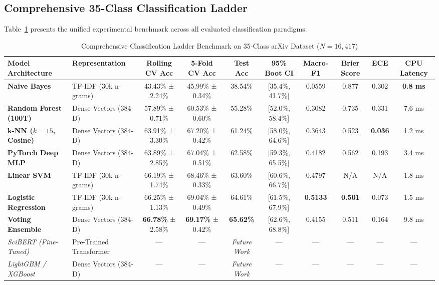 \documentclass[journal]{IEEEtran}
\begin{document}
\subsection{Comprehensive 35-Class Classification Ladder}
Table~\ref{tab:classification_ladder} presents the unified experimental benchmark across all evaluated classification paradigms.

\begin{table}[t]
\caption{Comprehensive Classification Ladder Benchmark on 35-Class arXiv Dataset ($N = 16,417$)}
\label{tab:classification_ladder}
\centering
\small
\begin{tabular}{llcccccccc}
\toprule
\textbf{Model Architecture} & \textbf{Representation} & \textbf{Rolling CV Acc} & \textbf{5-Fold CV Acc} & \textbf{Test Acc} & \textbf{95\% Boot CI} & \textbf{Macro-F1} & \textbf{Brier Score} & \textbf{ECE} & \textbf{CPU Latency} \\
\midrule
\textbf{Naive Bayes} & TF-IDF (30k n-grams) & 43.43\% ± 2.24\% & 45.99\% ± 0.34\% & 38.54\% & [35.4\%, 41.7\%] & 0.0559 & 0.877 & 0.302 & \textbf{0.8 ms} \\
\textbf{Random Forest (100T)} & Dense Vectors (384-D) & 57.89\% ± 0.71\% & 60.53\% ± 0.60\% & 55.28\% & [52.0\%, 58.4\%] & 0.3082 & 0.735 & 0.331 & 7.6 ms \\
\textbf{k-NN ($k=15$, Cosine)} & Dense Vectors (384-D) & 63.91\% ± 3.30\% & 67.20\% ± 0.42\% & 61.24\% & [58.0\%, 64.6\%] & 0.3643 & 0.523 & \textbf{0.036} & 1.2 ms \\
\textbf{PyTorch Deep MLP} & Dense Vectors (384-D) & 63.89\% ± 2.85\% & 67.04\% ± 0.51\% & 62.58\% & [59.3\%, 65.5\%] & 0.4182 & 0.562 & 0.193 & 3.4 ms \\
\textbf{Linear SVM} & TF-IDF (30k n-grams) & 66.19\% ± 1.74\% & 68.46\% ± 0.33\% & 63.60\% & [60.6\%, 66.7\%] & 0.4797 & N/A & N/A & 1.8 ms \\
\textbf{Logistic Regression} & TF-IDF (30k n-grams) & 66.25\% ± 1.13\% & 69.04\% ± 0.49\% & 64.61\% & [61.5\%, 67.9\%] & \textbf{0.5133} & \textbf{0.501} & 0.073 & 1.5 ms \\
\textbf{Voting Ensemble} & Dense Vectors (384-D) & \textbf{66.78\%} ± 2.58\% & \textbf{69.17\%} ± 0.42\% & \textbf{65.62\%} & [62.6\%, 68.8\%] & 0.4155 & 0.511 & 0.164 & 9.8 ms \\
\textit{SciBERT (Fine-Tuned)} & Pre-Trained Transformer & --- & --- & \textit{Future Work} & --- & --- & --- & --- & --- \\
\textit{LightGBM / XGBoost} & Dense Vectors (384-D) & --- & --- & \textit{Future Work} & --- & --- & --- & --- & --- \\
\bottomrule
\end{tabular}
\end{table}
\end{document}
